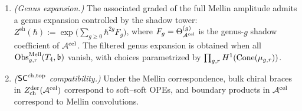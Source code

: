 \begin{proposition}
\begin{enumerate}[label=\textup{(\roman*)}]
associated-graded comparison.
\item \emph{(Genus expansion.)}
The associated graded of the full Mellin amplitude admits a genus
expansion controlled by the shadow tower:
$Z^{\mathrm{sh}}(\hbar) := \exp\!\bigl(\sum_{g \geq 0} \hbar^{2g}
F_g\bigr)$, where $F_g = \Theta_{\mathcal A^{\mathrm{cel}}}^{(g)}$ is the
genus-$g$ shadow coefficient of $\mathcal A^{\mathrm{cel}}$. The filtered
genus expansion is obtained when all
$\operatorname{Obs}^{\mathrm{Mell}}_{g,r}(T_4,\mathfrak b)$ vanish, with choices
parametrized by \(\prod_{g,r}H^1(\operatorname{Cone}(\mu_{g,r}))\).
\item \emph{($\mathsf{SC}^{\mathrm{ch,top}}$ compatibility.)}
Under the Mellin correspondence, bulk chiral braces in
$Z^{\mathrm{der}}_{\mathrm{ch}}(\mathcal A^{\mathrm{cel}})$ correspond to
soft--soft OPEs, and boundary products in $\mathcal A^{\mathrm{cel}}$
correspond to Mellin convolutions.
\end{enumerate}
\end{proposition}

